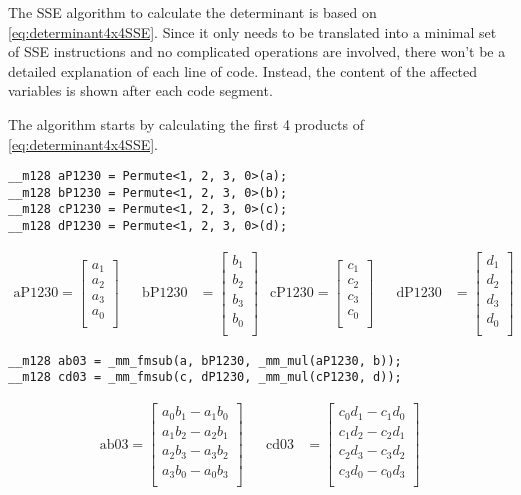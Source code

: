 The SSE algorithm to calculate the determinant is based on \cref{eq:determinant4x4SSE}.
Since it only needs to be translated into a minimal set of SSE instructions and no complicated operations are involved, there won't be a detailed explanation of each line of code.
Instead, the content of the affected variables is shown after each code segment.

The algorithm starts by calculating the first 4 products of \cref{eq:determinant4x4SSE}.


\begin{verbatim}
__m128 aP1230 = Permute<1, 2, 3, 0>(a);
__m128 bP1230 = Permute<1, 2, 3, 0>(b);
__m128 cP1230 = Permute<1, 2, 3, 0>(c);
__m128 dP1230 = Permute<1, 2, 3, 0>(d);
\end{verbatim}

\begin{align*}
\mathrm{aP1230} 
=
\begin{bmatrix}
a_1\\
a_2\\
a_3\\
a_0\\
\end{bmatrix}
&&
\mathrm{bP1230} 
&=
\begin{bmatrix}
b_1\\
b_2\\
b_3\\
b_0\\
\end{bmatrix}
&
\mathrm{cP1230} 
=
\begin{bmatrix}
c_1\\
c_2\\
c_3\\
c_0\\
\end{bmatrix}
&&
\mathrm{dP1230} 
&=
\begin{bmatrix}
d_1\\
d_2\\
d_3\\
d_0\\
\end{bmatrix}
\end{align*}

\begin{verbatim}
__m128 ab03 = _mm_fmsub(a, bP1230, _mm_mul(aP1230, b));
__m128 cd03 = _mm_fmsub(c, dP1230, _mm_mul(cP1230, d));
\end{verbatim}


\begin{align*}
\mathrm{ab03} 
=
\begin{bmatrix}
a_0b_1 - a_1b_0\\
a_1b_2 - a_2b_1\\
a_2b_3 - a_3b_2\\
a_3b_0 - a_0b_3\\
\end{bmatrix}
&&
\mathrm{cd03} 
&=
\begin{bmatrix}
c_0d_1 - c_1d_0\\
c_1d_2 - c_2d_1\\
c_2d_3 - c_3d_2\\
c_3d_0 - c_0d_3\\
\end{bmatrix}
\end{align*}

